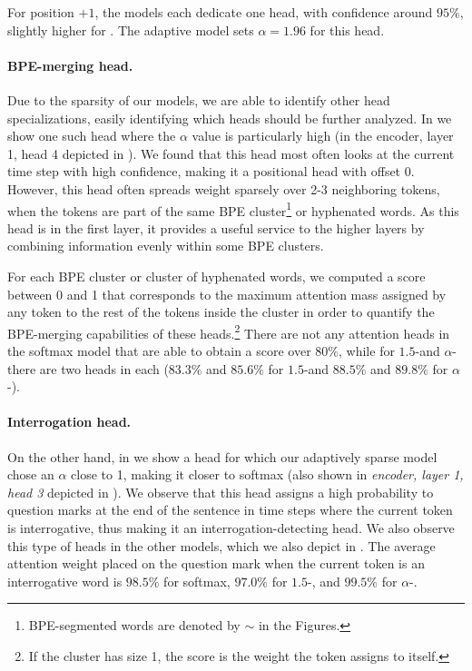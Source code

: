 For position $+1$, the models each dedicate one head, with confidence
around $95\%$, slightly higher for \entmaxtext. The adaptive model
sets $\alpha=1.96$ for this head.

\paragraph*{BPE-merging head.}
Due to the sparsity of our models, we are able to identify other head
specializations, easily identifying which heads should be further analyzed.
In  we show one such head where the $\alpha$ value
is particularly high (in the encoder, layer 1, head 4 depicted in
). We found that this head most often looks at
the current time step with high confidence, making it a positional head
with offset $0$. However, this head often spreads weight sparsely
over 2-3 neighboring tokens, when the tokens are part of the same BPE
cluster\footnote{BPE-segmented words are denoted by $\sim$ in the
    Figures.} or hyphenated words. As this head is in the first layer, it
provides a useful service to the higher layers by combining
information evenly within some BPE clusters.

For each BPE cluster or cluster of hyphenated words,
we computed a score between 0 and 1 that corresponds to the
maximum attention mass assigned by any token to the rest of the
tokens inside the cluster in order to quantify the BPE-merging
capabilities of these heads.\footnote{If the
    cluster has size 1, the score is the weight the token assigns to
    itself.} There are not any attention heads in
the softmax model that are able to obtain a score over $80\%$, while
for $1.5$-\entmaxtext and $\alpha$-\entmaxtext there are two heads
in each ($83.3\%$ and $85.6\%$ for $1.5$-\entmaxtext and $88.5\%$ and
$89.8\%$ for $\alpha$-\entmaxtext).

\paragraph*{Interrogation head.}
On the other hand, in  we show a head for which our
adaptively sparse model chose an $\alpha$ close to 1, making it
closer to softmax (also shown in {\it encoder, layer 1, head 3}
depicted in ). We observe that this head
assigns a high probability to question marks at the end of the
sentence in time steps where the current token is interrogative, thus
making it an interrogation-detecting head. We also observe this type
of heads in the other models, which we also depict in
. The average attention weight placed on the
question mark when the current token is an interrogative word is
$98.5\%$ for softmax, $97.0\%$ for $1.5$-\entmaxtext, and $99.5\%$
for $\alpha$-\entmaxtext.

